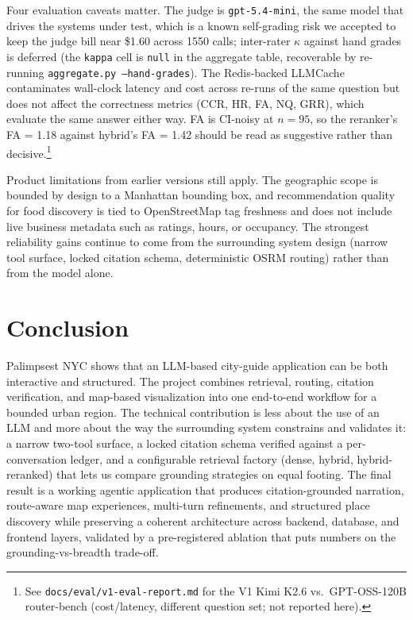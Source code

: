 \documentclass[sigconf,nonacm]{acmart}
\begin{document}
Four evaluation caveats matter. The judge is \texttt{gpt-5.4-mini}, the same model that drives the systems under test, which is a known self-grading risk we accepted to keep the judge bill near \$1.60 across 1550 calls; inter-rater $\kappa$ against hand grades is deferred (the \texttt{kappa} cell is \texttt{null} in the aggregate table, recoverable by re-running \texttt{aggregate.py --hand-grades}). The Redis-backed LLMCache contaminates wall-clock latency and cost across re-runs of the same question but does not affect the correctness metrics (CCR, HR, FA, NQ, GRR), which evaluate the same answer either way. FA is CI-noisy at $n=95$, so the reranker's FA = 1.18 against hybrid's FA = 1.42 should be read as suggestive rather than decisive.\footnote{See \texttt{docs/eval/v1-eval-report.md} for the V1 Kimi K2.6 vs.\ GPT-OSS-120B router-bench (cost/latency, different question set; not reported here).}

Product limitations from earlier versions still apply. The geographic scope is bounded by design to a Manhattan bounding box, and recommendation quality for food discovery is tied to OpenStreetMap tag freshness and does not include live business metadata such as ratings, hours, or occupancy. The strongest reliability gains continue to come from the surrounding system design (narrow tool surface, locked citation schema, deterministic OSRM routing) rather than from the model alone.

\section{Conclusion}
Palimpsest NYC shows that an LLM-based city-guide application can be both interactive and structured. The project combines retrieval, routing, citation verification, and map-based visualization into one end-to-end workflow for a bounded urban region. The technical contribution is less about the use of an LLM and more about the way the surrounding system constrains and validates it: a narrow two-tool surface, a locked citation schema verified against a per-conversation ledger, and a configurable retrieval factory (dense, hybrid, hybrid-reranked) that lets us compare grounding strategies on equal footing. The final result is a working agentic application that produces citation-grounded narration, route-aware map experiences, multi-turn refinements, and structured place discovery while preserving a coherent architecture across backend, database, and frontend layers, validated by a pre-registered ablation that puts numbers on the grounding-vs-breadth trade-off.
\end{document}
